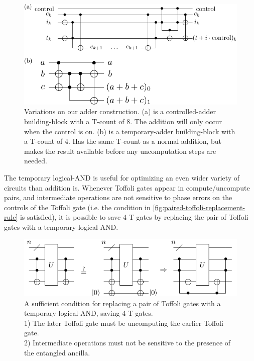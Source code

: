 \documentclass[twocolumn]{quantumarticle-customized}
\begin{document}
\begin{figure}
  \includegraphics[width=\linewidth]{other-adder-building-blocks.pdf}
  \caption{
	Variations on our adder construction.
	(a) is a controlled-adder building-block with a T-count of 8.
	The addition will only occur when the control is on.
	(b) is a temporary-adder building-block with a T-count of 4.
	Has the same T-count as a normal addition, but makes the result available before any uncomputation steps are needed.
  }
  \label{fig:other-adder-building-blocks}
\end{figure}

The temporary logical-AND is useful for optimizing an even wider variety of circuits than addition is.
Whenever Toffoli gates appear in compute/uncompute pairs, and intermediate operations are not sensitive to phase errors on the controls of the Toffoli gate (i.e. the condition in \autoref{fig:paired-toffoli-replacement-rule} is satisfied), it is possible to save 4 T gates by replacing the pair of Toffoli gates with a temporary logical-AND.

\begin{figure}
  \includegraphics[width=\linewidth]{paired-toffoli-replacement-rule.pdf}
  \caption{
	A sufficient condition for replacing a pair of Toffoli gates with a temporary logical-AND, saving 4 T gates.\\
	1) The later Toffoli gate must be uncomputing the earlier Toffoli gate.\\
	2) Intermediate operations must not be sensitive to the presence of the entangled ancilla.
  }
  \label{fig:paired-toffoli-replacement-rule}
\end{figure}
\end{document}
